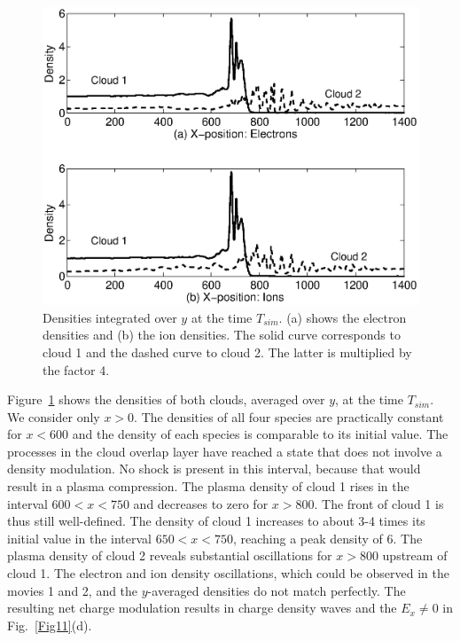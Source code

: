 \documentclass[structabstract]{aa}
\begin{document}
\begin{figure}
\centering
\includegraphics[width=\columnwidth]{Fig13.eps}
\caption{Densities integrated over $y$ at the time $T_{sim}$. (a) shows the 
electron densities and (b) the ion densities. The solid curve corresponds 
to cloud 1 and the dashed curve to cloud 2. The latter is multiplied by the 
factor 4.}\label{Fig13}
\end{figure}

Figure~\ref{Fig13} shows the densities of both clouds, averaged over $y$, 
at the time $T_{sim}$. We consider only $x>0$. The densities of all four 
species are practically constant for $x<600$ and the density of each species 
is comparable to its initial value. The processes in the cloud overlap layer 
have reached a state that does not involve a density modulation. No shock 
is present in this interval, because that would result in a plasma compression.
The plasma density of cloud 1 rises in the interval $600 < x < 750$ and 
decreases to zero for $x>800$. The front of cloud 1 is thus still well-defined. 
The density of cloud 1 increases to about 3-4 times its initial value in the 
interval $650<x<750$, reaching a peak density of 6. The plasma density of 
cloud 2 reveals substantial oscillations for $x>800$ upstream of cloud 1. 
The electron and ion density oscillations, which could be observed in the 
movies 1 and 2, and the $y$-averaged densities do not match perfectly. The 
resulting net charge modulation results in charge density waves and the 
$E_x \neq 0$ in Fig.~\ref{Fig11}(d).
\end{document}
